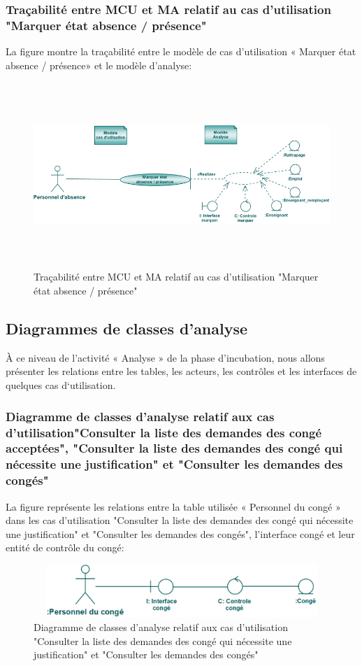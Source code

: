 \documentclass[12 pt ]{report}
\begin{document}
\subsubsection{Traçabilité entre MCU et MA relatif au  cas d’utilisation "Marquer état absence / présence" }
La figure  montre la traçabilité entre le modèle de  cas d’utilisation « Marquer état absence / présence» et le modèle d’analyse:
\begin{figure}[h]
\begin{center}
\includegraphics[width= 12cm , height =7cm]{tra_mar_abs.PNG}
\caption{Traçabilité entre MCU et MA relatif au  cas d’utilisation "Marquer état absence / présence"}
\end{center}
\end{figure}
\subsection{Diagrammes de classes d'analyse}
 À ce niveau de l’activité « Analyse » de la phase d’incubation, nous allons présenter les relations entre les tables, les acteurs, les contrôles et les interfaces de quelques cas d‘utilisation.
 \newpage
\subsubsection{Diagramme de classes d’analyse relatif aux cas d’utilisation"Consulter la liste des demandes des congé acceptées", "Consulter la liste des demandes des congé qui nécessite une justification" et "Consulter les demandes des congés" }
La figure  représente les relations entre la table utilisée « Personnel du congé » dans les cas d’utilisation  "Consulter la liste des demandes des congé qui nécessite une justification" et "Consulter les demandes des congés", l’interface  congé et  leur entité de  contrôle du congé:
\begin{figure}[h]
\begin{center}
\includegraphics[width= 12cm , height =2cm]{cla_con.png}
\caption{Diagramme de classes d’analyse relatif aux cas d’utilisation "Consulter la liste des demandes des congé qui nécessite une justification" et "Consulter les demandes des congés"}
\end{center}
\end{figure}
\end{document}

